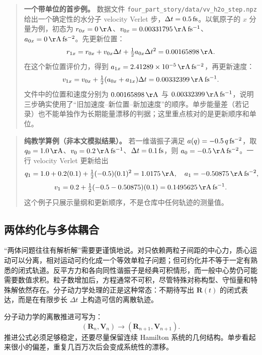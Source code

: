 \documentclass[UTF8,10pt,a4paper,fontset=none]{ctexart}
\begin{document}
\begin{quote}\small
\textbf{一个带单位的首步例。} 数据文件
\texttt{four\_part\_story/data/vv\_h2o\_step.npz} 给出一个确定性的水分子 velocity Verlet 步，\(\Delta t=0.5\,{\rm fs}\)。以氧原子的 \(x\) 分量为例，初态为
\(r_{0x}=0\,{\rm \AA}\)、\(v_{0x}=0.00331795\,{\rm \AA\,fs^{-1}}\)、\(a_{0x}=0\,{\rm \AA\,fs^{-2}}\)。先更新位置：
\[
r_{1x}=r_{0x}+v_{0x}\Delta t+\tfrac12a_{0x}\Delta t^2
       =0.00165898\,{\rm \AA}.
\]
在这个新位置评价力，得到 \(a_{1x}=2.41289\times10^{-5}\,{\rm \AA\,fs^{-2}}\)，再更新速度：
\[
v_{1x}=v_{0x}+\tfrac12(a_{0x}+a_{1x})\Delta t
       =0.00332399\,{\rm \AA\,fs^{-1}}.
\]
文件中的位置和速度分别为 \(0.00165898\,{\rm \AA}\) 与 \(0.00332399\,{\rm \AA\,fs^{-1}}\)，说明三步确实使用了“旧加速度--新位置--新加速度”的顺序。单步能量差（若记录）也不能单独作为长期能量漂移的判据；这里重点核对的是更新顺序和单位。
\end{quote}

\begin{quote}\small
\textbf{纯教学算例（非本文模拟结果）。} 若一维谐振子满足 \(a(q)=-0.5\,q\,{\rm fs^{-2}}\)，取 \(q_0=1.0\,{\rm \AA}\)、\(v_0=0.2\,{\rm \AA\,fs^{-1}}\)、\(\Delta t=0.1\,{\rm fs}\)，则 \(a_0=-0.5\,{\rm \AA\,fs^{-2}}\)。一行 velocity Verlet 更新给出
\[
q_1=1.0+0.2(0.1)+\tfrac12(-0.5)(0.1)^2=1.0175\,{\rm \AA},
\quad a_1=-0.50875\,{\rm \AA\,fs^{-2}},
\]
\[
v_1=0.2+\tfrac12(-0.5-0.50875)(0.1)
   =0.1495625\,{\rm \AA\,fs^{-1}}.
\]
这个例子只展示量纲和更新顺序，不是仓库中任何轨迹的测量值。
\end{quote}

\subsection{两体约化与多体耦合}

“两体问题往往有解析解”需要更谨慎地说。对只依赖两粒子间距的中心力，质心运动可以分离，相对运动可约化成一个等效单粒子问题；但可约化并不等于一定有熟悉的闭式轨道。反平方力和各向同性谐振子是经典可积情形，而一般中心势仍可能需要数值求积。粒子数增加后，方程通常不可积，尽管特殊对称构型、守恒量和特殊解依然存在。分子动力学处理的正是这种常态：不期待写出 $\bm R(t)$ 的闭式表达，而是在有限步长 $\Delta t$ 上构造可信的离散轨迹。

分子动力学的离散推进可写为：
\begin{equation}
  (\bm R_n,\bm V_n)\longrightarrow
  (\bm R_{n+1},\bm V_{n+1}).
\end{equation}
推进公式必须足够稳定，还要尽量保留连续 Hamilton 系统的几何结构。单步看起来很小的偏差，重复几百万次后会变成系统性的漂移。
\end{document}
